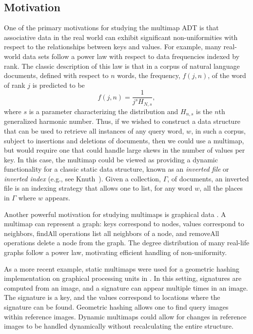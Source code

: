\documentclass[11pt,letterpaper]{article}
\begin{document}
\subsection{Motivation}
\label{sec:motivation}
One of the primary motivations for studying the multimap ADT is that
associative data in the real world can exhibit significant
non-uniformities with respect to the relationships between keys and
values.  For example, many real-world data sets follow 
a power law with respect to data frequencies indexed by rank.
The classic description of this law is that in a corpus of
natural language documents, defined with respect to $n$ words,
the frequency, $f(j,n)$, of the word of rank $j$ is predicted to be
\[
f(j,n) = \frac{1}{{j^s}{H_{N,s}}} ,
\]
where $s$ is a parameter characterizing the distribution and
$H_{n,s}$ is the $n$th generalized harmonic number.
Thus, if we wished to construct a data structure that can be used
to retrieve all instances of any query word, $w$, in such a corpus, 
subject to insertions and deletions of documents, then we could
use a multimap, but would require one that could handle large skews
in the number of values per key.  
In this case, the multimap could be viewed
as providing a dynamic functionality for
a classic static data structure, known as an \emph{inverted file}
or \emph{inverted index} (e.g., see Knuth~\cite{k-ss-73}).
Given a collection, $\Gamma$, of documents, an inverted file is an
indexing strategy that allows one to list, for any word $w$,
all the places in $\Gamma$ where $w$ appears.

Another powerful motivation for studying multimaps is graphical
data \cite{bb-cdvk-08}.  A multimap can represent a graph: keys
correspond to nodes, values correspond to neighbors, findAll
operations list all neighbors of a node, and removeAll operations
delete a node from the graph.  The degree distribution of many
real-life graphs follow a power law, motivating efficient handling of
non-uniformity.  

As a more recent example, static multimaps were used for a geometric
hashing implementation on graphical processing units
in \cite{asasmoa-rtphg-09}.  In this setting, signatures are computed from
an image, and a signature can appear multiple times in an image.  The
signature is a key, and the values correspond to locations where the
signature can be found.  Geometric hashing allows one to find query
images within reference images.  Dynamic multimaps could allow for
changes in reference images to be handled dynamically without
recalculating the entire structure.
\end{document}
